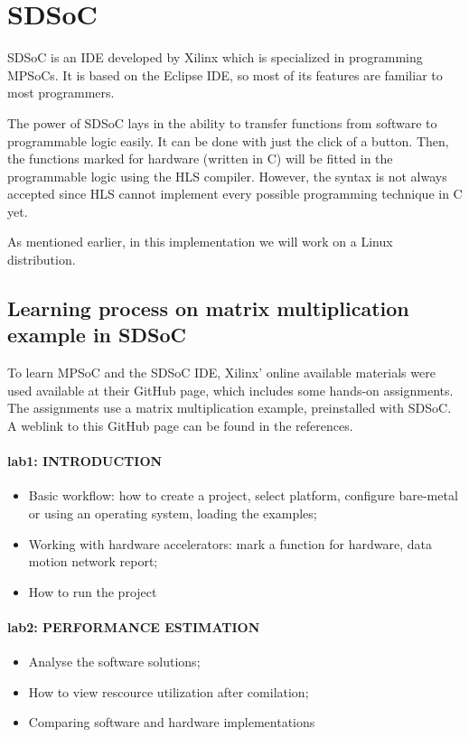 \section{SDSoC}

SDSoC is an IDE developed by Xilinx which is specialized in programming MPSoCs. It is based on the Eclipse IDE, so most of its features are familiar to most programmers. 

The power of SDSoC lays in the ability to transfer functions from software to programmable logic easily. It can be done with just the click of a button. Then, the functions marked for hardware (written in C) will be fitted in the programmable logic using the HLS compiler. However, the syntax is not always accepted since HLS cannot implement every possible programming technique in C yet.

As mentioned earlier, in this implementation we will work on a Linux distribution.

\subsection{Learning process on matrix multiplication example in SDSoC}

To learn MPSoC and the SDSoC IDE, Xilinx' online available materials were used available at their GitHub page, which includes some hands-on assignments. The assignments use a matrix multiplication example, preinstalled with SDSoC. A weblink to this GitHub page can be found in the references.%

\paragraph{lab1: INTRODUCTION}
\begin{itemize}
	\item Basic workflow: how to create a project, select platform, configure bare-metal or using an operating system, loading the examples;
	\item Working with hardware accelerators: mark a function for hardware, data motion network report;
	\item How to run the project
\end{itemize}

\paragraph{lab2: PERFORMANCE ESTIMATION} 
\begin{itemize}
	\item Analyse the software solutions;
	\item How to view rescource utilization after comilation; 
	\item Comparing software and hardware implementations
\end{itemize}

